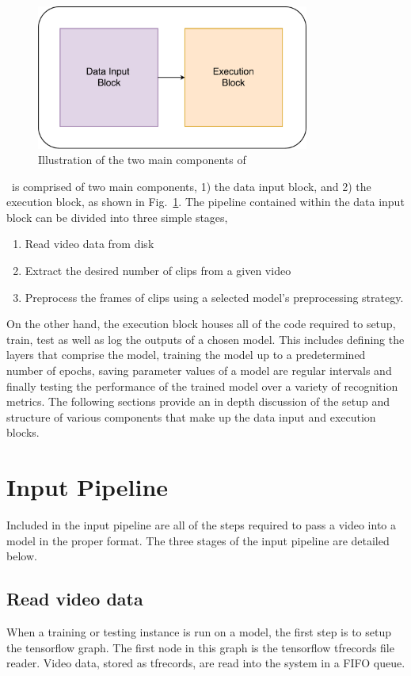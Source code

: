 \documentclass{llncs}
\begin{document}
\begin{figure}[b!]
\centering
\includegraphics[width=0.8\textwidth]{images/overview.pdf}
\caption{Illustration of the two main components of \acro}
\label{fig:overview}
\end{figure}

\acro~is comprised of two main components, 1) the data input block, and 2) the execution block, as shown in Fig.~\ref{fig:overview}. 
The pipeline contained within the data input block can be divided into three simple stages,
\begin{enumerate}
\item Read video data from disk
\item Extract the desired number of clips from a given video
\item Preprocess the frames of clips using a selected model's preprocessing strategy.
\end{enumerate}
On the other hand, the execution block houses all of the code required to setup, train, test as well as log the outputs of a chosen model.
This includes defining the layers that comprise the model, training the model up to a predetermined number of epochs, saving parameter values of a model are regular intervals and finally testing the performance of the trained model over a variety of recognition metrics.
The following sections provide an in depth discussion of the setup and structure of various components that make up the data input and execution blocks.

\section{Input Pipeline}
\label{sec:ippipeline}
Included in the input pipeline are all of the steps required to pass a video into a model in the proper format.
The three stages of the input pipeline are detailed below.

\subsection{Read video data}
\label{sec:readdata}
When a training or testing instance is run on a model, the first step is to setup the tensorflow graph.
The first node in this graph is the tensorflow tfrecords file reader. 
Video data, stored as tfrecords, are read into the system in a FIFO queue.
\end{document}
